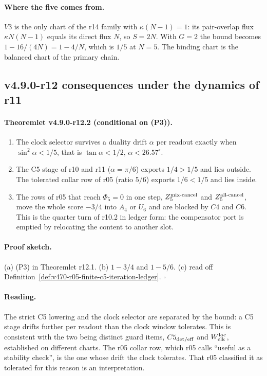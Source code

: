 \paragraph{Where the five comes from.}
\(V3\) is the only chart of the r14 family with \(\kappa(N-1)=1\): its pair-overlap flux \(\kappa N(N-1)\) equals its direct
flux \(N\), so \(S=2N\).  With \(G=2\) the bound becomes \(1-16/(4N)=1-4/N\), which is \(1/5\) at \(N=5\).  The binding chart is the
balanced chart of the primary chain.

\subsection*{v4.9.0-r12 consequences under the dynamics of r11}
\label{subsec:v490-r12-consequences}

\paragraph{Theoremlet v4.9.0-r12.2 (conditional on (P3)).}
\begin{enumerate}[leftmargin=2em]
\item[(a)] The clock selector survives a duality drift \(\alpha\) per readout exactly when \(\sin^2\alpha<1/5\), that is
\(\tan\alpha<1/2\), \(\alpha<26.57^\circ\).
\item[(b)] The C5 stage of r10 and r11 (\(\alpha=\pi/6\)) exports \(1/4>1/5\) and lies outside.  The tolerated collar row of
r05 (ratio \(5/6\)) exports \(1/6<1/5\) and lies inside.
\item[(c)] The rows of r05 that reach \(\Phi_5=0\) in one step, \(Z_5^{\rm mix\text{-}cancel}\) and
\(Z_5^{\rm all\text{-}cancel}\), move the whole score \(-3/4\) into \(A_4\) or \(U_6\) and are blocked by \(C4\) and \(C6\).  This is
the quarter turn of r10.2 in ledger form: the compensator port is emptied by relocating the content to another slot.
\end{enumerate}

\paragraph{Proof sketch.}
(a) (P3) in Theoremlet r12.1.  (b) \(1-3/4\) and \(1-5/6\).  (c) read off
Definition~\ref{def:v470-r05-finite-c5-iteration-ledger}.  \(\square\)

\paragraph{Reading.}
The strict C5 lowering and the clock selector are separated by the bound: a C5 stage drifts further per readout than the
clock window tolerates.  This is consistent with the two being distinct guard items, \(C5_{\rm det/eff}\) and
\(W_{\rm clk}^{\rm loc}\), established on different charts.  The r05 collar row, which r05 calls ``useful as a stability
check'', is the one whose drift the clock tolerates.  That r05 classified it as tolerated for this reason is an
interpretation.

